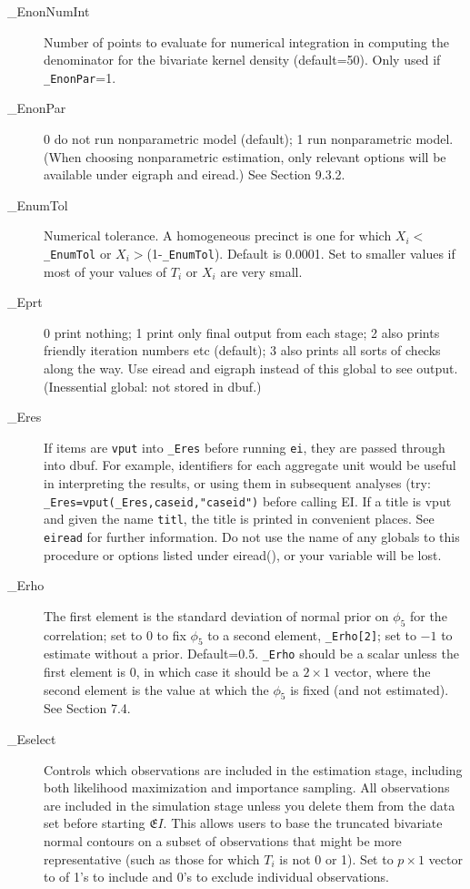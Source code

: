 \documentclass[11pt,titlepage]{article}
\newcommand{\EI}{\ensuremath{{\mathfrak EI}}}
\begin{document}
\begin{description}
\item[\_EnonNumInt] Number of points to evaluate for numerical
  integration in computing the denominator for the bivariate kernel
  density (default=50).  Only used if \texttt{\_EnonPar}=1.

\item[\_EnonPar] 0 do not run nonparametric model (default); 1 run
  nonparametric model.  (When choosing nonparametric estimation, only
  relevant options will be available under eigraph and eiread.)  See
  Section 9.3.2.

\item[\_EnumTol] Numerical tolerance.  A homogeneous precinct is one
  for which $X_i<$\texttt{\_EnumTol} or $X_i>$(1-\texttt{\_EnumTol}).
  Default is 0.0001.  Set to smaller values if most of your values of
  $T_i$ or $X_i$ are very small.

\item[\_Eprt] 0 print nothing; 1 print only final output from each
  stage; 2 also prints friendly iteration numbers etc (default); 3
  also prints all sorts of checks along the way.  Use eiread and
  eigraph instead of this global to see output.  (Inessential global:
  not stored in dbuf.)

\item[\_Eres] If items are \texttt{vput} into \texttt{\_Eres} before
  running \texttt{ei}, they are passed through into dbuf.  For
  example, identifiers for each aggregate unit would be useful in
  interpreting the results, or using them in subsequent analyses (try:
  \texttt{\_Eres=vput(\_Eres,caseid,"caseid")} before calling EI.  If
  a title is vput and given the name \texttt{titl}, the title is
  printed in convenient places.  See \texttt{eiread} for further
  information.  Do not use the name of any globals to this procedure
  or options listed under eiread(), or your variable will be lost.
  
\item[\_Erho] The first element is the standard deviation of normal
  prior on $\phi_5$ for the correlation; set to 0 to fix $\phi_5$ to a
  second element, \texttt{\_Erho[2]}; set to $-1$ to estimate without
  a prior.  Default=0.5.  \texttt{\_Erho} should be a scalar unless
  the first element is 0, in which case it should be a $2\times 1$
  vector, where the second element is the value at which the $\phi_5$
  is fixed (and not estimated).  See Section 7.4.

\item[\_Eselect] Controls which observations are included in the
  estimation stage, including both likelihood maximization and
  importance sampling. All observations are included in the simulation
  stage unless you delete them from the data set before starting \EI.
  This allows users to base the truncated bivariate normal contours on
  a subset of observations that might be more representative (such as
  those for which $T_i$ is not 0 or 1).  Set to $p\times 1$ vector to
  of 1's to include and 0's to exclude individual observations.


\end{description}
\end{document}
